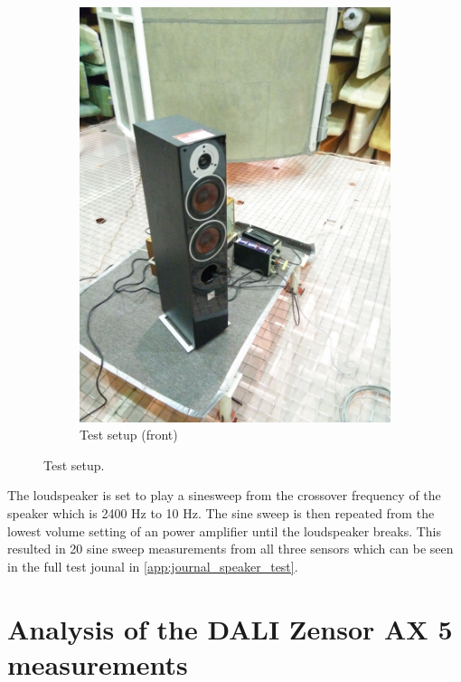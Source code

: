 \begin{figure}[H]
\begin{subfigure}[t]{0.47\textwidth}
	\includegraphics[width=1\textwidth]{figures/Test_setup_front.jpg}
	\caption{Test setup (front)}
	\label{fig:test_setup_front_R}
\end{subfigure}
\caption{Test setup.}
\label{fig:test_setup_R}
\end{figure}

The loudspeaker is set to play a sinesweep from the crossover frequency of the speaker which is 2400 Hz to 10 Hz. The sine sweep is then repeated from the lowest volume setting of an power amplifier until the loudspeaker breaks. This resulted in 20 sine sweep measurements from all three sensors which can be seen in the full test jounal in \autoref{app:journal_speaker_test}.    


\section{Analysis of the DALI Zensor AX 5 measurements}

